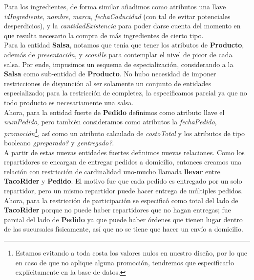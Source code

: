 \documentclass[11pt,letterpaper]{article}
\begin{document}
Para los ingredientes, de forma similar añadimos como atributos una llave \textit{idIngrediente}, \textit{nombre}, \textit{marca}, \textit{fechaCaducidad} (con tal de evitar potenciales desperdicios), y la \textit{cantidadExistencia} para poder darse cuenta del momento en que resulta necesario la compra de más ingredientes de cierto tipo. \\

Para la entidad \textbf{Salsa}, notamos que tenía que tener los atributos de \textbf{Producto}, además de \textit{presentación}, y \textit{scoville} para contemplar el nivel de picor de cada salsa. Por ende, impusimos un esquema de especialización, considerando a la \textbf{Salsa} como sub-entidad de \textbf{Producto}. No hubo necesidad de imponer restricciones de disyunción al ser solamente un conjunto de entidades especializado; para la restricción de completez, la especificamos parcial ya que no todo producto es necesariamente una salsa.\\

Ahora, para la entidad fuerte de \textbf{Pedido} definimos como atributo llave el \textit{numPedido}, pero también consideramos como atributos la \textit{fechaPedido}, \textit{promoción}\footnote{Estamos evitando a toda costa los valores nulos en nuestro diseño, por lo que en caso de que no aplique alguna promoción, tendremos que especificarlo explícitamente en la base de datos.}, así como un atributo calculado de \textit{costoTotal} y los atributos de tipo booleano \textit{¿preparado?} y \textit{¿entregado?}.\\

A partir de estas nuevas entidades fuertes definimos nuevas relaciones. Como los repartidores se encargan de entregar pedidos a domicilio, entonces creamos una relación con restricción de cardinalidad uno-mucho llamada \textbf{llevar} entre \textbf{TacoRider} y \textbf{Pedido}. El motivo fue que cada pedido es entregado por un solo repartidor, pero un mismo repartidor puede hacer entrega de múltiples pedidos. Ahora, para la restricción de participación se especificó como total del lado de \textbf{TacoRider} porque no puede haber repartidores que no hagan entregas; fue parcial del lado de \textbf{Pedido} ya que puede haber órdenes que tienen lugar dentro de las sucursales físicamente, así que no se tiene que hacer un envío a domicilio.\\
\end{document}
